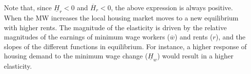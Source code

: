 Note that, since $\underline{H}_r < 0$ and $\overline{H}_r < 0$, the above expression is always 
positive. When the MW increases the local housing market moves to a new equilibrium with higher 
rents. The magnitude of the elasticity is driven by the relative magnitudes of the earnings of 
minimum wage workers ($\overline{w}$) and rents ($r$), and the slopes of the different 
functions in equilibrium. For instance, a higher response of housing demand to the minimum wage 
change ($\underline{H}_w$) would result in a higher elasticity.